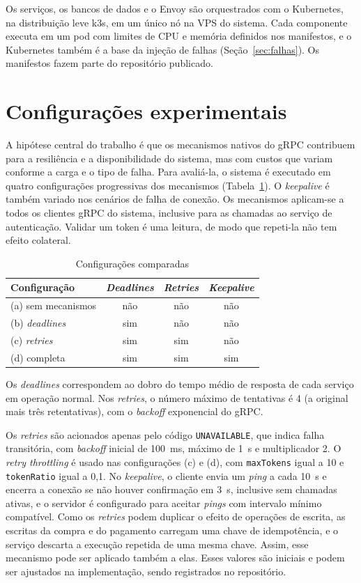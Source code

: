 Os serviços, os bancos de dados e o Envoy são orquestrados com o Kubernetes, na distribuição leve
k3s, em um único nó na VPS do sistema. Cada componente executa em um pod com limites de
CPU e memória definidos nos manifestos, e o Kubernetes também é a base da injeção de falhas
(Seção~\ref{sec:falhas}). Os manifestos fazem parte do repositório publicado.

\section{Configurações experimentais}

A hipótese central do trabalho é que os mecanismos nativos do gRPC contribuem para a resiliência e
a disponibilidade do sistema, mas com custos que variam conforme a carga e o tipo de falha. Para
avaliá-la, o sistema é executado em quatro configurações progressivas dos mecanismos
(Tabela~\ref{tab:configuracoes}). O \textit{keepalive} é também variado nos cenários de falha de
conexão. Os mecanismos aplicam-se a todos os clientes gRPC do sistema, inclusive para as chamadas ao
serviço de autenticação. Validar um token é uma leitura, de modo que repeti-la não tem efeito colateral.

\begin{table}[htb]
  \centering
  \caption{Configurações comparadas}\label{tab:configuracoes}
  \begin{tabular}{lccc}
    \hline
    Configuração & \textit{Deadlines} & \textit{Retries} & \textit{Keepalive} \\
    \hline
    (a) sem mecanismos & não & não & não \\
    (b) \textit{deadlines} & sim & não & não \\
    (c) \textit{retries}   & sim & sim & não \\
    (d) completa           & sim & sim & sim \\
    \hline
  \end{tabular}
  \fonte{}
\end{table}

Os \textit{deadlines} correspondem ao dobro do tempo médio de resposta de cada serviço em operação normal.
Nos \textit{retries}, o número máximo de tentativas é 4 (a original mais três retentativas), com o
\textit{backoff} exponencial do gRPC.

Os \textit{retries} são acionados apenas pelo código \texttt{UNAVAILABLE}, que indica falha
transitória, com \textit{backoff} inicial de 100~ms, máximo de 1~s e multiplicador 2. O
\textit{retry throttling} é usado nas configurações (c) e (d), com \texttt{maxTokens} igual a 10 e
\texttt{tokenRatio} igual a 0,1. No \textit{keepalive}, o cliente envia um \textit{ping} a cada 10~s e
encerra a conexão se não houver confirmação em 3~s, inclusive sem chamadas ativas, e o servidor é
configurado para aceitar \textit{pings} com intervalo mínimo compatível. Como os \textit{retries}
podem duplicar o efeito de operações de escrita, as escritas da compra e do
pagamento carregam uma chave de idempotência, e o serviço descarta a execução repetida de uma
mesma chave. Assim, esse mecanismo pode ser aplicado também a elas. Esses valores são
iniciais e podem ser ajustados na implementação, sendo registrados no repositório.

